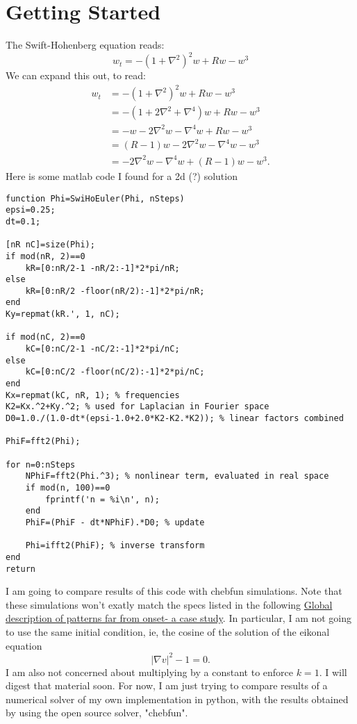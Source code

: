 \documentclass[12pt]{article}
\newcounter{solution}
\begin{document}
\section{Getting Started}
The Swift-Hohenberg equation reads:
\[
    w_t = -(1+\nabla^2)^2w+Rw-w^3
\] 
We can expand this out, to read:
\begin{align*}
    w_t &= -(1+\nabla^2)^2w+Rw-w^3\\
        &= -(1+2\nabla^2+\nabla^4)w + Rw - w^3\\
        &= -w -2\nabla^2w - \nabla^4w + Rw - w^3\\
        &= (R-1)w - 2\nabla^2w - \nabla^4w - w^3\\
        &= -2\nabla^2w - \nabla^4w + (R-1)w - w^3.
\end{align*}
Here is some matlab code I found for a 2d (?) solution
\begin{verbatim}
function Phi=SwiHoEuler(Phi, nSteps)
epsi=0.25;
dt=0.1;

[nR nC]=size(Phi);
if mod(nR, 2)==0
    kR=[0:nR/2-1 -nR/2:-1]*2*pi/nR;
else
    kR=[0:nR/2 -floor(nR/2):-1]*2*pi/nR;
end
Ky=repmat(kR.', 1, nC);

if mod(nC, 2)==0
    kC=[0:nC/2-1 -nC/2:-1]*2*pi/nC;
else
    kC=[0:nC/2 -floor(nC/2):-1]*2*pi/nC;
end
Kx=repmat(kC, nR, 1); % frequencies
K2=Kx.^2+Ky.^2; % used for Laplacian in Fourier space
D0=1.0./(1.0-dt*(epsi-1.0+2.0*K2-K2.*K2)); % linear factors combined

PhiF=fft2(Phi);

for n=0:nSteps
    NPhiF=fft2(Phi.^3); % nonlinear term, evaluated in real space
    if mod(n, 100)==0
        fprintf('n = %i\n', n);
    end
    PhiF=(PhiF - dt*NPhiF).*D0; % update

    Phi=ifft2(PhiF); % inverse transform
end
return
\end{verbatim}
I am going to compare results of this code with chebfun simulations.
Note that these simulations won't exatly match the specs listed in the following \href{https://reader.elsevier.com/reader/sd/pii/S0167278903002173?token=5E308C2CE01D7A2C31F3F52EFD268A5627B573414D7087B53EEE149494E9A89E7E3CC8E80260C9D50F9A7E65F656E307&originRegion=us-east-1&originCreation=20220914190634}{Global description of patterns far from onset- a case study}.
In particular, I am not going to use the same initial condition, ie, the cosine of the solution of the eikonal equation
\[
|\nabla v|^2-1 = 0.
\]
I am also not concerned about multiplying by a constant to enforce $k=1$.
I will digest that material soon. For now, I am just trying to compare results of a numerical solver of my own implementation in python, with the results obtained by using the open source solver, "chebfun".
\end{document}
